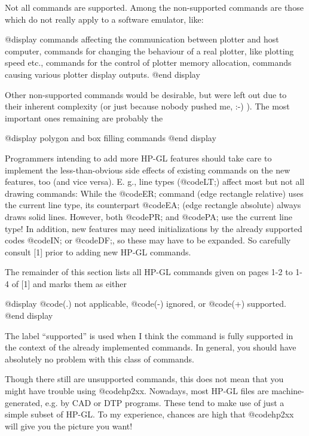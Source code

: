 Not all commands are supported. Among the non-supported commands
are those which do not really apply to a software emulator, like:

@display
commands affecting the communication between plotter and host computer,
commands for changing the behaviour of a real plotter, like plotting speed etc.,
commands for the control of plotter memory allocation,
commands causing various plotter display outputs.
@end display

Other non-supported commands would be desirable, but were left out
due to their inherent complexity (or just because nobody pushed me, :-) ).
The most important ones remaining are probably the

@display
polygon and box filling commands
@end display

Programmers intending to add more HP-GL features should take care to
implement the less-than-obvious side effects of existing commands on
the new features, too (and vice versa). E. g., line types (@code{LT;})
affect most but not all drawing commands: While the @code{ER;} command
(edge rectangle relative) uses the current line type, its counterpart
@code{EA;} (edge rectangle absolute) always draws solid lines. However,
both @code{PR;} and @code{PA;} use the current line type! In addition,
new features may need initializations by the already supported
codes @code{IN;} or @code{DF;}, so these may have to be expanded.
So carefully consult [1] prior to adding new HP-GL commands.

The remainder of this section lists all HP-GL commands given on
pages 1-2 to 1-4 of [1] and marks them as either

@display
      @code{(.)}  not applicable,
      @code{(-)}  ignored, or
      @code{(+)}  supported.
@end display

The label ``supported'' is used when I think the command is fully supported
in the context of the already implemented commands. In general,
you should have absolutely no problem with this class of commands.

Though there still are unsupported commands, this does not mean that
you might have trouble using @code{hp2xx}. Nowadays, most HP-GL files are
machine-generated, e.g. by CAD or DTP programs. These tend to make use
of just a simple subset of HP-GL. To my experience, chances are high
that @code{hp2xx} will give you the picture you want!

